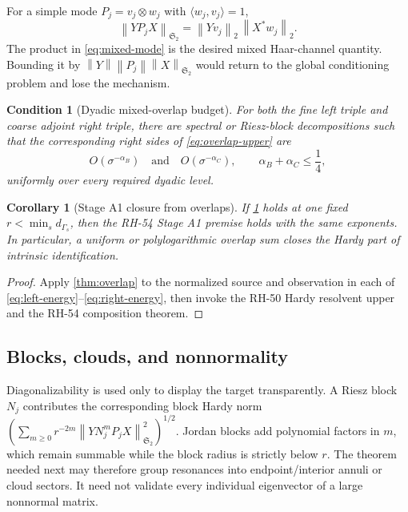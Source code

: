 \documentclass[11pt]{article}
\newtheorem{corollary}[theorem]{Corollary}
\newtheorem{condition}[theorem]{Condition}
\theoremstyle{remark}
\newcommand{\norm}[1]{\left\lVert#1\right\rVert}
\newcommand{\HS}{\mathfrak S_2}
\begin{document}
For a simple mode $P_j=v_j\otimes w_j$ with
$\langle w_j,v_j\rangle=1$,
\begin{equation}
 \norm{YP_jX}_{\HS}
 =\norm{Yv_j}_2\,\norm{X^*w_j}_2.
 \label{eq:mixed-mode}
\end{equation}
The product in \eqref{eq:mixed-mode} is the desired mixed Haar-channel
quantity.  Bounding it by
$\norm Y\norm{P_j}\norm X_{\HS}$ would return to the global conditioning
problem and lose the mechanism.

\begin{condition}[Dyadic mixed-overlap budget]
\label{cond:overlap}
For both the fine left triple and coarse adjoint right triple, there are
spectral or Riesz-block decompositions such that the corresponding right
sides of \eqref{eq:overlap-upper} are
\begin{equation}
 O(\sigma^{-\alpha_B})
 \quad\text{and}\quad
 O(\sigma^{-\alpha_C}),
 \qquad
 \alpha_B+\alpha_C\le\frac14,
 \label{eq:overlap-budget}
\end{equation}
uniformly over every required dyadic level.
\end{condition}

\begin{corollary}[Stage A1 closure from overlaps]
If \cref{cond:overlap} holds at one fixed
$r<\min_s d_{\Gamma_s}$, then the RH-54 Stage A1 premise holds with the same
exponents.  In particular, a uniform or polylogarithmic overlap sum closes
the Hardy part of intrinsic identification.
\end{corollary}

\begin{proof}
Apply \cref{thm:overlap} to the normalized source and observation in each of
\eqref{eq:left-energy}--\eqref{eq:right-energy}, then invoke the RH-50 Hardy
resolvent upper and the RH-54 composition theorem.
\end{proof}

\subsection{Blocks, clouds, and nonnormality}

Diagonalizability is used only to display the target transparently.  A Riesz
block $N_j$ contributes the corresponding block Hardy norm
\(\left(\sum_{m\ge0}r^{-2m}\norm{YN_j^mP_jX}_{\HS}^2\right)^{1/2}\).
Jordan blocks add polynomial factors in $m$, which remain summable while the
block radius is strictly below $r$.  The theorem needed next may therefore
group resonances into endpoint/interior annuli or cloud sectors.  It need not
validate every individual eigenvector of a large nonnormal matrix.
\end{document}
